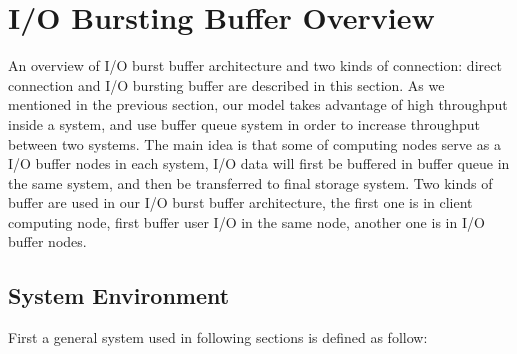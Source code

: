 \section{I/O Bursting Buffer Overview}
\label{sec:burst_buffer}


An overview of I/O burst buffer architecture and two kinds of connection: direct connection and I/O bursting buffer are described in this section.
As we mentioned in the previous section, our model takes advantage of high throughput inside a system, and use buffer queue system in order to increase throughput between two systems.
The main idea is that some of computing nodes serve as a I/O buffer nodes in each system, I/O data will first be buffered in buffer queue in the same system, and then be transferred to final storage system.
Two kinds of buffer are used in our I/O burst buffer architecture, the first one is in client computing node, first buffer user I/O in the same node, another one is in I/O buffer nodes.




\subsection{System Environment}
First a general system used in following sections is defined as follow:

